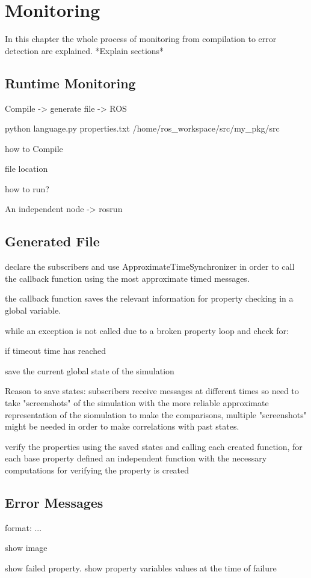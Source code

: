 \chapter{Monitoring}
\label{chap:monitoring}

In this chapter the whole process of monitoring from compilation to error detection are explained. *Explain sections*

\section{Runtime Monitoring}

Compile -> generate file -> ROS

python language.py properties.txt /home/ros\_workspace/src/my\_pkg/src

how to Compile

file location

how to run?

An independent node -> rosrun

\section{Generated File}

declare the subscribers and use ApproximateTimeSynchronizer in order to call the callback function using the most approximate timed messages.

the callback function saves the relevant information for property checking in a global variable.

while an exception is not called due to a broken property loop and check for:

if timeout time has reached

save the current global state of the simulation

Reason to save states: subscribers receive messages at different times so need to take "screenshots" of the simulation with the more reliable approximate representation of the siomulation to make the comparisons, multiple "screenshots" might be needed in order to make correlations with past states.

verify the properties using the saved states and calling each created function, for each base property defined an independent function with the necessary computations for verifying the property is created

\section{Error Messages}

format: ...

show image

show failed property. show property variables values at the time of failure